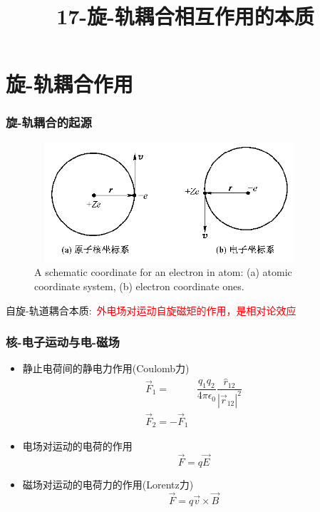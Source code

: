 \title{17-旋-轨耦合相互作用的本质}
\section{旋-轨耦合作用}
\frame
{
\frametitle{旋-轨耦合的起源}
\begin{figure}[h!]
\centering
\includegraphics[height=1.75in,width=3.95in,viewport=0 0 600 270,clip]{Figures/SOC_cor.png}
\caption{\tiny \textrm{A schematic coordinate for an electron in atom: (a) atomic coordinate system, (b) electron coordinate ones.}}%
\label{Nuclear_Electron}
\end{figure}
自旋-轨道耦合本质:~\textcolor{red}{外电场对运动自旋磁矩的作用，是相对论效应}
}

\frame
{
\frametitle{核-电子运动与电-磁场}
\begin{itemize}
	\item 静止电荷间的静电力作用(\textrm{Coulomb}力)
		\begin{displaymath}
			\begin{aligned}
				\vec F_1=&\dfrac{q_1q_2}{4\pi\epsilon_0}\dfrac{\hat r_{12}}{|\vec r_{12}|^2}\\
				\vec F_2=-\vec F_1
			\end{aligned}
		\end{displaymath}
	\item 电场对运动的电荷的作用
		\begin{displaymath}
			\vec F=q\vec E
		\end{displaymath}
	\item 磁场对运动的电荷力的作用(\textrm{Lorentz}力)
		\begin{displaymath}
		\vec F=q\vec v\times\vec B
		\end{displaymath}
\end{itemize}
}

